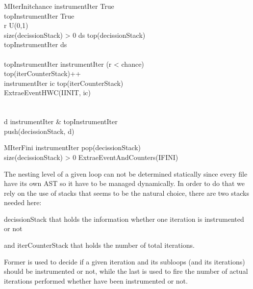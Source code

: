 \begin{multicols}{2}
  \begin{pseudocode}{MIterInit}{chance}
  \label{pc:mercurium_monitor_iter_init}
      instrumentIter \GETS True\\
      topInstrumentIter \GETS True\\
      r \in U(0,1)\\
      \IF size(decissionStack) > 0 \THEN
      \BEGIN
        ds \GETS top(decissionStack)\\
        topInstrumentIter \GETS ds\\
      \END\\
      \IF topInstrumentIter \THEN
      \BEGIN
          instrumentIter \GETS (r < chance)\\
          top(iterCounterStack)++\\
          \IF instrumentIter \THEN
          \BEGIN
              ic \GETS top(iterCounterStack)\\
              ExtraeEventHWC(IINIT, ic)\\
          \END\\
      \END\\
      d \GETS instrumentIter \&  topInstrumentIter\\
      push(decissionStack, d)\\
  \end{pseudocode}

  \begin{pseudocode}{MIterFini}{ }
  \label{pc:mercurium_monitor_iter_fini}
      instrumentIter \GETS pop(decissionStack)\\
      \IF size(decissionStack) > 0 \THEN
      \BEGIN
        ExtraeEventAndCounters(IFINI)
      \END\\
  \end{pseudocode}
\end{multicols}

The nesting level
of a given loop can not be determined statically since every file have its own
AST so it have to be managed dynamically. In order to do that we rely on the use
of stacks that seems to be the natural choice, there are two stacks needed
here:
\begin{enumerate*}[label=\roman*)]
  \item decissionStack that holds the information whether one iteration is
    instrumented or not
  \item and iterCounterStack that holds the number of total iterations.
\end{enumerate*}
Former is used to decide if a given iteration and its subloops (and its 
iterations) should be instrumented or not, while the last is used to fire the
number of actual iterations performed whether have been instrumented or not.



